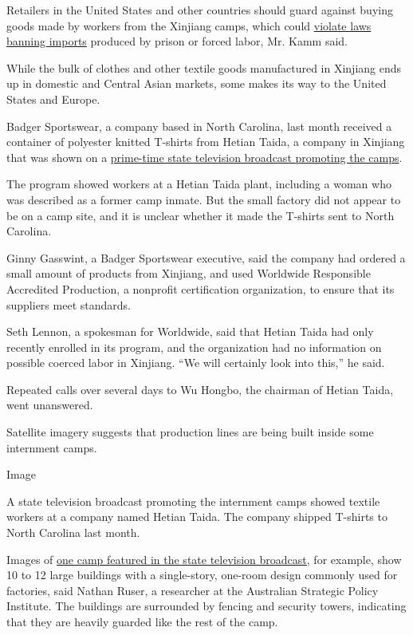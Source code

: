 Retailers in the United States and other countries should guard against
buying goods made by workers from the Xinjiang camps, which could
\href{https://www.uscc.gov/sites/default/files/Research/Staff\%20Report_Prison\%20Labor\%20Exports\%20from\%20China_Final\%20Report\%20070914.pdf}{violate
laws banning imports} produced by prison or forced labor, Mr. Kamm said.

While the bulk of clothes and other textile goods manufactured in
Xinjiang ends up in domestic and Central Asian markets, some makes its
way to the United States and Europe.

Badger Sportswear, a company based in North Carolina, last month
received a container of polyester knitted T-shirts from Hetian Taida, a
company in Xinjiang that was shown on a
\href{https://www.youtube.com/watch?v=REGM8I2iMjU}{prime-time state
television broadcast promoting the camps}.

The program showed workers at a Hetian Taida plant, including a woman
who was described as a former camp inmate. But the small factory did not
appear to be on a camp site, and it is unclear whether it made the
T-shirts sent to North Carolina.

Ginny Gasswint, a Badger Sportswear executive, said the company had
ordered a small amount of products from Xinjiang, and used Worldwide
Responsible Accredited Production, a nonprofit certification
organization, to ensure that its suppliers meet standards.

Seth Lennon, a spokesman for Worldwide, said that Hetian Taida had only
recently enrolled in its program, and the organization had no
information on possible coerced labor in Xinjiang. ``We will certainly
look into this,'' he said.

Repeated calls over several days to Wu Hongbo, the chairman of Hetian
Taida, went unanswered.

Satellite imagery suggests that production lines are being built inside
some internment camps.

Image

A state television broadcast promoting the internment camps showed
textile workers at a company named Hetian Taida. The company shipped
T-shirts to North Carolina last month.

Images of
\href{https://medium.com/@shawnwzhang/satellite-imagery-of-xinjiang-re-education-camp-63-\%E6\%96\%B0\%E7\%96\%86\%E5\%86\%8D\%E6\%95\%99\%E8\%82\%B2\%E9\%9B\%86\%E4\%B8\%AD\%E8\%90\%A5\%E5\%8D\%AB\%E6\%98\%9F\%E5\%9B\%BE-63-5b324fa241d1}{one
camp featured in the state television broadcast}, for example, show 10
to 12 large buildings with a single-story, one-room design commonly used
for factories, said Nathan Ruser, a researcher at the Australian
Strategic Policy Institute. The buildings are surrounded by fencing and
security towers, indicating that they are heavily guarded like the rest
of the camp.

